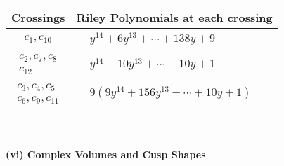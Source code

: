 \documentclass[1p]{elsarticle_modified}
\theoremstyle{definition}
\begin{document}
\begin{tabular}{m{50pt}|m{274pt}}
Crossings & \hspace{64pt}Riley Polynomials at each crossing \\
\hline $$\begin{aligned}c_{1},c_{10}\end{aligned}$$&$\begin{aligned}
&y^{14}+6 y^{13}+\cdots+138 y+9
\end{aligned}$\\
\hline $$\begin{aligned}c_{2},c_{7},c_{8}\\c_{12}\end{aligned}$$&$\begin{aligned}
&y^{14}-10 y^{13}+\cdots-10 y+1
\end{aligned}$\\
\hline $$\begin{aligned}c_{3},c_{4},c_{5}\\c_{6},c_{9},c_{11}\end{aligned}$$&$\begin{aligned}
&9(9 y^{14}+156 y^{13}+\cdots+10 y+1)
\end{aligned}$\\
\hline
\end{tabular}\\~\\
\newpage\flushleft \textbf{(vi) Complex Volumes and Cusp Shapes}
\end{document}
